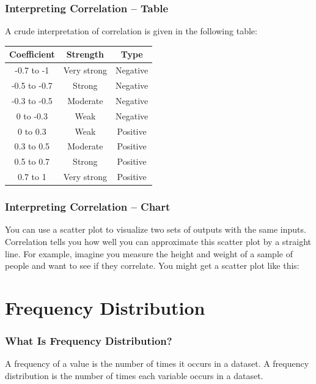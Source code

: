 \documentclass[aspectratio=169,11pt,svgnames,handout]{beamer}
\begin{document}
\begin{frame}
 \frametitle{Interpreting Correlation -- Table}
 A crude interpretation of correlation is given in the following table:
 \begin{center}
  \begin{tabular}{ccc}
   \textbf{Coefficient} & \textbf{Strength} & \textbf{Type} \\
   \toprule
   -0.7 to -1 & Very strong & Negative\\
   -0.5 to -0.7 & Strong & Negative\\
   -0.3 to -0.5 & Moderate & Negative\\
   0 to -0.3 & Weak & Negative\\
   0 to 0.3 & Weak & Positive\\
   0.3 to 0.5 & Moderate & Positive\\
   0.5 to 0.7 & Strong & Positive\\
   0.7 to 1 & Very strong & Positive
  \end{tabular}
 \end{center}
\end{frame}

\begin{frame}
 \frametitle{Interpreting Correlation -- Chart}
 You can use a scatter plot to visualize two sets of outputs with the same
 inputs.
 \pause
 Correlation tells you \alert{how well you can approximate} this scatter plot by
 a straight line.
 \pause
 For example, imagine you measure the height and weight of a sample of people
 and want to see if they correlate. You might get a scatter plot like this:
 \pause
 \begin{center}
 \end{center}
\end{frame}

\section{Frequency Distribution}

\begin{frame}
 \frametitle{What Is Frequency Distribution?}
 \begin{tcolorbox}[title=Frequency Distribution]
  A \alert{frequency} of a value is the number of times it occurs in a dataset.
  A \alert{frequency distribution} is the number of times each variable occurs
  in a dataset.
 \end{tcolorbox}
\end{frame}
\end{document}
